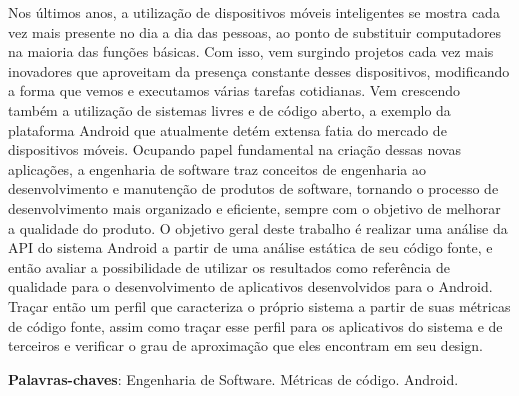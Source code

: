 \begin{resumo}

Nos últimos anos, a utilização de dispositivos móveis inteligentes se mostra cada vez mais presente no dia a dia das pessoas, ao ponto de substituir computadores na maioria das funções básicas. Com isso, vem surgindo projetos cada vez mais inovadores que aproveitam da presença constante desses dispositivos, modificando a forma que vemos e executamos várias tarefas cotidianas. Vem crescendo também a utilização de sistemas livres e de código aberto, a exemplo da plataforma Android que atualmente detém extensa fatia do mercado de dispositivos móveis. Ocupando papel fundamental na criação dessas novas aplicações, a engenharia de software traz conceitos de engenharia ao desenvolvimento e manutenção de produtos de software, tornando o processo de desenvolvimento mais organizado e eficiente, sempre com o objetivo de melhorar a qualidade do produto. O objetivo geral deste trabalho é realizar uma análise da API do sistema Android a partir de uma análise estática de seu código fonte, e então avaliar a possibilidade de utilizar os resultados como referência de qualidade para o desenvolvimento de aplicativos desenvolvidos para o Android. Traçar então um perfil que caracteriza o próprio sistema a partir de suas métricas de código fonte, assim como traçar esse perfil para os aplicativos do sistema e de terceiros e verificar o grau de aproximação que eles encontram em seu design. 


\vspace{\onelineskip}
    
 \noindent
 \textbf{Palavras-chaves}: Engenharia de Software. Métricas de código. Android.

\end{resumo}
